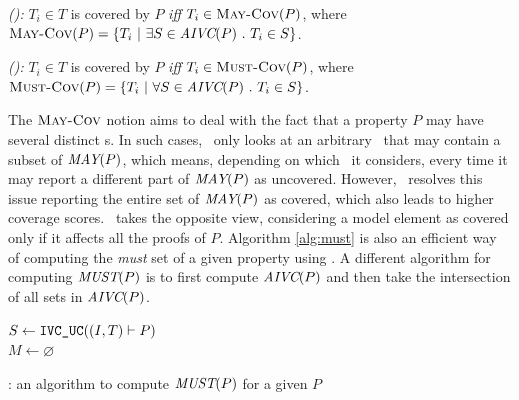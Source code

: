 
\begin{definition} {\emph{(\maycov):}}
  \label{def:comp-1}
 $T_i \in T$ is covered by $P$ \emph{iff} $T_i \in \text{\sc May-Cov} (P)$, where
   $\text{\sc May-Cov} (P) = \{T_i ~|~ \exists S \in \textit{AIVC}(P)~.~T_i \in S \}$.
\end{definition}

\begin{definition} {\emph{(\mustcov):}}
  \label{def:mustcov}
 $T_i \in T$ is covered by $P$ \emph{iff} $T_i \in \text{\sc Must-Cov} (P)$, where
   $\text{\sc Must-Cov} (P) = \{T_i ~|~ \forall S \in \textit{AIVC}(P)~.~T_i \in S \}$.
\end{definition}

The $\text{\sc May-Cov}$ notion aims to deal with the fact that a property $P$ may have
several distinct {\mivc}s. In such cases, \ivccov\ only looks at an arbitrary \mivc\
that may contain a subset of $\textit{MAY}(P)$, which means, depending on
which \mivc\ it considers, every time it may report a different part of $\textit{MAY}(P)$
as uncovered. However, \maycov\ resolves this issue reporting the entire set of $\textit{MAY}(P)$ as covered, which also leads to higher coverage scores.  \mustcov\ takes the opposite view, considering a model element as covered only if it affects all the proofs of $P$.
Algorithm \ref{alg:must} is also an efficient way of computing the \emph{must} set of a given property using \ucalg. A different algorithm for computing $\textit{MUST} (P)$ is to first compute $\textit{AIVC} (P)$ and then take the intersection of all sets in $\textit{AIVC} (P)$.


\begin{algorithm}
  \BlankLine
  $S \leftarrow \ucalg((I, T) \vdash P)$ \\
  $M \leftarrow \varnothing$ \\
   {
  }
\caption{\mustalg: an algorithm to compute $\textit{MUST}(P)$ for a given $P$}
\label{alg:must}
\end{algorithm}

